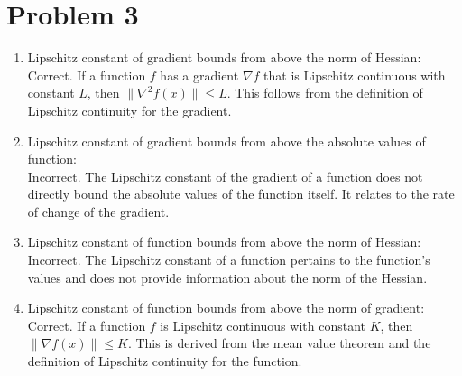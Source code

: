 \documentclass[12pt]{article}
\begin{document}
\section{Problem 3}

\begin{enumerate}
    \item Lipschitz constant of gradient bounds from above the norm of Hessian: \\
    Correct. If a function \( f \) has a gradient \( \nabla f \) that is Lipschitz continuous with constant \( L \), then \( \| \nabla^2 f(x) \| \leq L \). This follows from the definition of Lipschitz continuity for the gradient.

    \item Lipschitz constant of gradient bounds from above the absolute values of function: \\
    Incorrect. The Lipschitz constant of the gradient of a function does not directly bound the absolute values of the function itself. It relates to the rate of change of the gradient.

    \item Lipschitz constant of function bounds from above the norm of Hessian: \\
    Incorrect. The Lipschitz constant of a function pertains to the function's values and does not provide information about the norm of the Hessian.

    \item Lipschitz constant of function bounds from above the norm of gradient: \\
    Correct. If a function \( f \) is Lipschitz continuous with constant \( K \), then \( \| \nabla f(x) \| \leq K \). This is derived from the mean value theorem and the definition of Lipschitz continuity for the function.
\end{enumerate}
\end{document}
